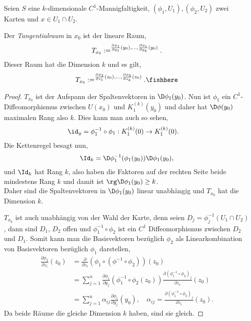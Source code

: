 \begin{prop}
\label{prop:4.7}
Seien $S$ eine $k$-dimensionale $C^1$-Mannigfaltigkeit,
$(\phi_1,U_1), (\phi_2,U_2)$ zwei Karten und $x\in U_1\cap U_2$.
  
Der \emph{Tangentialraum} in $x_0$ ist der lineare Raum,
\begin{align*}
T_{x_0} := \sp{\frac{\partial \phi_1}{\partial y_1}(y_0),\ldots,\frac{\partial
\phi_1}{\partial y_k}(y_0)}.
\end{align*}
Dieser Raum hat die Dimension $k$ und es gilt,
\begin{align*}
T_{x_0} := \sp{\frac{\partial \phi_2}{\partial z_1}(z_0),\ldots,\frac{\partial
\phi_2}{\partial z_k}(z_0)}.\fishhere
\end{align*}
\end{prop}
\begin{proof}
$T_{x_0}$ ist der Aufspann der Spaltenvektoren in $\D\phi_1(y_0)$. Nun ist
$\phi_1$ ein $C^1$-Diffeomorphismus zwischen $U(x_0)$ und $K_1^{(k)}{(y_0)}$
und daher hat $\D\phi(y_0)$ maximalen Rang also $k$. Dies kann man auch so
sehen,
\begin{align*}
&\id_y = \phi_1^{-1}\circ \phi_1: K_1^{(k)}(0) \to K_1^{(k)}(0).
\end{align*}
Die Kettenregel besagt nun,
\begin{align*}
\Id_k = \D \phi_1^{-1}(\phi_1(y_0))\D \phi_1(y_0),
\end{align*}
und $\Id_k$ hat Rang $k$, also haben die Faktoren auf der rechten Seite beide
mindestens Rang $k$ und damit ist $\rg\D\phi_1(y_0)\ge k$.\\
Daher sind die Spaltenvektoren in $\D\phi_1(y_0)$ linear unabhängig und
$T_{x_0}$ hat die Dimension $k$.

$T_{x_0}$ ist auch unabhängig von der Wahl der Karte, denn 
seien $D_j = \phi_j^{-1}(U_1\cap U_2)$, dann sind $D_1$, $D_2$ offen und
$\phi_1^{-1}\circ\phi_2$ ist ein $C^1$ Diffeomorphismus zwischen $D_2$ und
$D_1$. Somit kann man die Basisvektoren bezüglich $\phi_2$ als
Linearkombination von Basisvektoren bezüglich $\phi_1$ darstellen,
\begin{align*}
\frac{\partial\phi_2}{\partial z_i}(z_0)
&= \frac{\partial}{\partial z_i}(\phi_1\circ(\phi^{-1}\circ\phi_2))(z_0)
\\ &= \sum\limits_{j=1}^n \frac{\partial \phi_1}{\partial
y_j}(\phi_1^{-1}\circ\phi_2(z_0))\frac{\partial(\phi_1^{-1}\circ\phi_2)_j}{\partial
z_i}(z_0)
\\ &= \sum\limits_{j=1}^n \alpha_{ij}\frac{\partial \phi_1}{\partial
y_j}(y_0),\quad \alpha_{ij} = \frac{\partial(\phi_1^{-1}\circ\phi_2)_j}{\partial
z_i}(z_0).
\end{align*}
Da beide Räume die gleiche Dimension $k$ haben, sind sie gleich.\qedhere
\end{proof}

